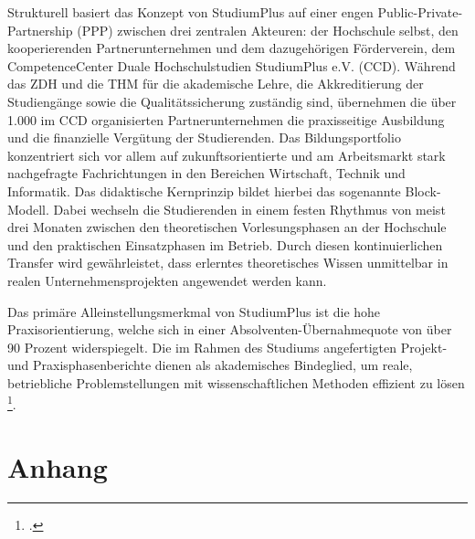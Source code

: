 \documentclass[12pt,a4paper]{scrartcl}
\begin{document}
	Strukturell basiert das Konzept von StudiumPlus auf einer engen Public-Private-Partnership (PPP) zwischen drei zentralen Akteuren: der Hochschule selbst, den kooperierenden Partnerunternehmen und dem dazugehörigen Förderverein, dem CompetenceCenter Duale Hochschulstudien StudiumPlus e.V. (CCD). Während das ZDH und die THM für die akademische Lehre, die Akkreditierung der Studiengänge sowie die Qualitätssicherung zuständig sind, übernehmen die über 1.000 im CCD organisierten Partnerunternehmen die praxisseitige Ausbildung und die finanzielle Vergütung der Studierenden.
	Das Bildungsportfolio konzentriert sich vor allem auf zukunftsorientierte und am Arbeitsmarkt stark nachgefragte Fachrichtungen in den Bereichen Wirtschaft, Technik und Informatik. Das didaktische Kernprinzip bildet hierbei das sogenannte Block-Modell. Dabei wechseln die Studierenden in einem festen Rhythmus von meist drei Monaten zwischen den theoretischen Vorlesungsphasen an der Hochschule und den praktischen Einsatzphasen im Betrieb. Durch diesen kontinuierlichen Transfer wird gewährleistet, dass erlerntes theoretisches Wissen unmittelbar in realen Unternehmensprojekten angewendet werden kann.
	
	Das primäre Alleinstellungsmerkmal von StudiumPlus ist die hohe Praxisorientierung, welche sich in einer Absolventen-Übernahmequote von über 90 Prozent widerspiegelt. Die im Rahmen des Studiums angefertigten Projekt- und Praxisphasenberichte dienen als akademisches Bindeglied, um reale, betriebliche Problemstellungen mit wissenschaftlichen Methoden effizient zu lösen \footcite{studiumplus2025,thm_profil}.
	

	\newpage
	\printbibliography[heading=bibnumbered, title={Literaturverzeichnis}]
	\newpage

	\appendix
	\section{Anhang}
	
	
	\newpage
\end{document}
